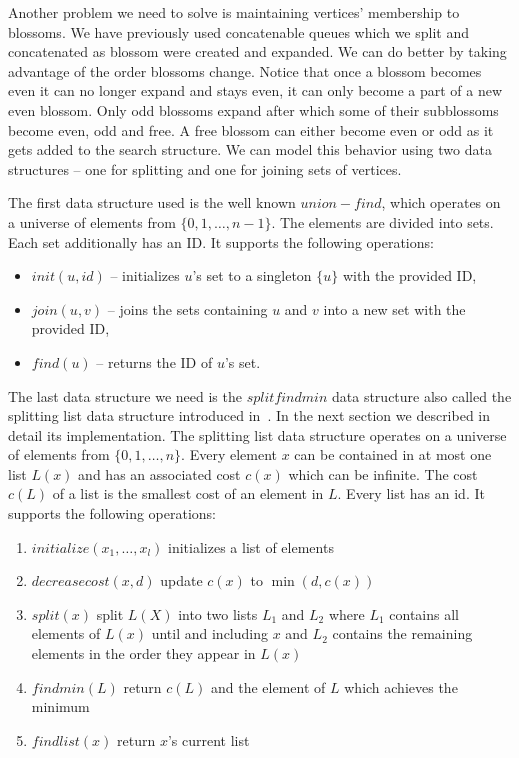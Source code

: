 Another problem we need to solve is maintaining vertices' membership to blossoms. We have previously used concatenable queues which we split and concatenated as blossom were created and expanded. We can do better by taking advantage of the order blossoms change. Notice that once a blossom becomes even it can no longer expand and stays even, it can only become a part of a new even blossom. Only odd blossoms expand after which some of their subblossoms become even, odd and free. A free blossom can either become even or odd as it gets added to the search structure. We can model this behavior using two data structures – one for splitting and one for joining sets of vertices.

The first data structure used is the well known $union-find$, which operates on a universe of elements from $\{ 0, 1, \dots, n-1 \}$. The elements are divided into sets. Each set additionally has an ID\@. It supports the following operations:

\begin{itemize}
    \item $init(u, id)$ – initializes $u$'s set to a singleton $\{u\}$ with the provided ID,
    \item $join(u, v)$ – joins the sets containing $u$ and $v$ into a new set with the provided ID,
    \item $find(u)$ – returns the ID of $u$'s set.
\end{itemize}

The last data structure we need is the $splitfindmin$ data structure also called the splitting list data structure introduced in~\cite{gabow1985scaling}. In the next section we described in detail its implementation. The splitting list data structure operates on a universe of elements from $\{0, 1, \dots, n\}$. Every element $x$ can be contained in at most one list $L(x)$ and has an associated cost $c(x)$ which can be infinite. The cost $c(L)$ of a list is the smallest cost of an element in $L$. Every list has an id. It supports the following operations:

\begin{enumerate}
    \item $initialize(x_1, \dots, x_l)$ initializes a list of elements
    \item $decreasecost(x, d)$ update $c(x)$ to $\min(d, c(x))$
    \item $split(x)$ split $L(X)$ into two lists $L_1$ and $L_2$ where $L_1$ contains all elements of $L(x)$ until and including $x$ and $L_2$ contains the remaining elements in the order they appear in $L(x)$
    \item $findmin(L)$ return $c(L)$ and the element of $L$ which achieves the minimum
    \item $findlist(x)$ return $x$'s current list
\end{enumerate}

